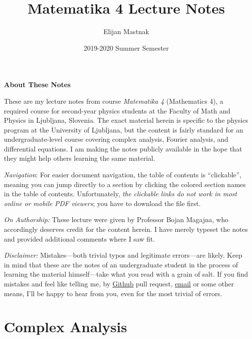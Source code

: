 \documentclass[11pt, a4paper]{article}
\begin{document}
\title{Matematika 4 Lecture Notes}
\author{Elijan Mastnak}
\date{2019-2020 Summer Semester}
\maketitle

\begin{center}
\textbf{About These Notes}
\end{center}
These are my lecture notes from course \textit{Matematika 4} (Mathematics 4), a required course for second-year physics students at the Faculty of Math and Physics in Ljubljana, Slovenia. The exact material herein is specific to the physics program at the University of Ljubljana, but the content is fairly standard for an undergraduate-level course covering complex analysis, Fourier analysis, and differential equations. I am making the notes publicly available in the hope that they might help others learning the same material.

\vspace{2mm}
\textit{Navigation}: For easier document navigation, the table of contents is ``clickable'', meaning you can jump directly to a section by clicking the colored section names in the table of contents. Unfortunately, \textit{the clickable links do not work in most online or mobile PDF viewers}; you have to download the file first.


\vspace{2mm}
\textit{On Authorship:} These lecture were given by Professor Bojan Magajna, who accordingly deserves credit for the content herein. I have merely typeset the notes and provided additional comments where I saw fit.

\vspace{2mm}
\textit{Disclaimer:} Mistakes---both trivial typos and legitimate errors---are likely. Keep in mind that these are the notes of an undergraduate student in the process of learning the material himself---take what you read with a grain of salt. If you find mistakes and feel like telling me, by \href{https://github.com/ejmastnak/fmf}{\underline{Github}} pull request, \href{mailto:ejmastnak@gmail.com}{\underline{email}} or some other means, I'll be happy to hear from you, even for the most trivial of errors.



\tableofcontents

\newpage

\section{Complex Analysis}
\end{document}
